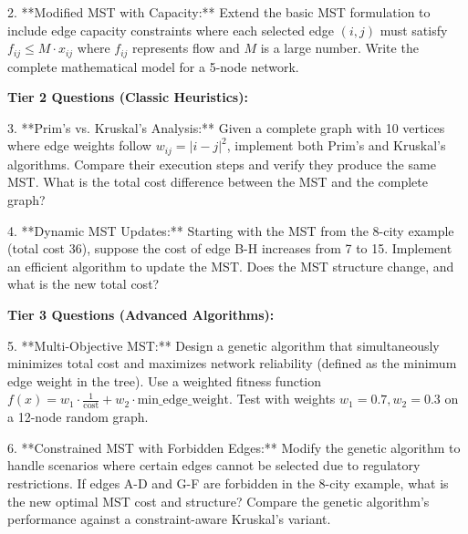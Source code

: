 \documentclass{article}
\begin{document}
2. **Modified MST with Capacity:** Extend the basic MST formulation to include edge capacity constraints where each selected edge $(i,j)$ must satisfy $f_{ij} \leq M \cdot x_{ij}$ where $f_{ij}$ represents flow and $M$ is a large number. Write the complete mathematical model for a 5-node network.

\textbf{Tier 2 Questions (Classic Heuristics):}

3. **Prim's vs. Kruskal's Analysis:** Given a complete graph with 10 vertices where edge weights follow $w_{ij} = |i-j|^2$, implement both Prim's and Kruskal's algorithms. Compare their execution steps and verify they produce the same MST. What is the total cost difference between the MST and the complete graph?

4. **Dynamic MST Updates:** Starting with the MST from the 8-city example (total cost 36), suppose the cost of edge B-H increases from 7 to 15. Implement an efficient algorithm to update the MST. Does the MST structure change, and what is the new total cost?

\textbf{Tier 3 Questions (Advanced Algorithms):}

5. **Multi-Objective MST:** Design a genetic algorithm that simultaneously minimizes total cost and maximizes network reliability (defined as the minimum edge weight in the tree). Use a weighted fitness function $f(x) = w_1 \cdot \frac{1}{\text{cost}} + w_2 \cdot \text{min\_edge\_weight}$. Test with weights $w_1 = 0.7, w_2 = 0.3$ on a 12-node random graph.

6. **Constrained MST with Forbidden Edges:** Modify the genetic algorithm to handle scenarios where certain edges cannot be selected due to regulatory restrictions. If edges A-D and G-F are forbidden in the 8-city example, what is the new optimal MST cost and structure? Compare the genetic algorithm's performance against a constraint-aware Kruskal's variant.
\end{document}
